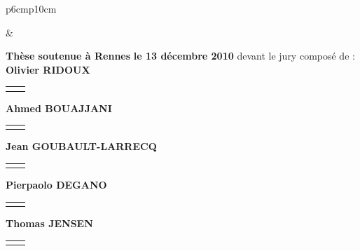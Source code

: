 \documentclass[10pt]{book}
\begin{document}
\begin{titlepage}
\begin{center}
\begin{minipage}{\glarg}
\begin{tabular}{p{6cm}p{10cm}}
\begin{minipage}{\plarg}
\hspace{-1.8cm}{\huge\bf  modèle}
\end{minipage}
&
\begin{minipage}{\plarg}
{\large\bf Th\`ese soutenue \`a Rennes\vspace{1mm}\newline}
{\large\bf le 13 décembre 2010\vspace{2mm}\newline}
{\large devant le jury compos\'e de : \vspace{2mm}\newline}
{\Large\bf Olivier RIDOUX\vspace{0mm}\newline}
{\begin{tabular}{lr}
    \hspace{-2mm}{Professeur à l'université~Rennes~1}  & \hspace{2cm}{pr\'esident}
  \end{tabular}\newline}

{\Large\bf Ahmed BOUAJJANI\vspace{0mm}\newline}
{\begin{tabular}{lr}
    \hspace{-2mm}{Professeur à l'université~Paris~7} & \hspace{2.05cm}{rapporteur}
  \end{tabular}\newline}

{\Large\bf Jean GOUBAULT-LARRECQ\vspace{0mm}\newline}
{\begin{tabular}{lr}
    \hspace{-2mm}{Professeur à l'ENS~Cachan} & \hspace{2.8cm}{rapporteur}
  \end{tabular}\newline}

{\Large\bf Pierpaolo DEGANO\vspace{0mm}\newline}
{\begin{tabular}{lr}
    \hspace{-2mm}{Professeur à l'Università~di~Pisa} & \hspace{1.75cm}{examinateur}
  \end{tabular}\newline}

{\Large\bf Thomas JENSEN\vspace{0mm}\newline}
{\begin{tabular}{lr}
    \hspace{-2mm}{Directeur de Recherche à l'INRIA} & \hspace{.65cm}{directeur de th\`ese}
  \end{tabular}\newline}


\end{minipage}
\end{tabular}
\end{minipage}
\end{center}
\end{titlepage}
\end{document}
